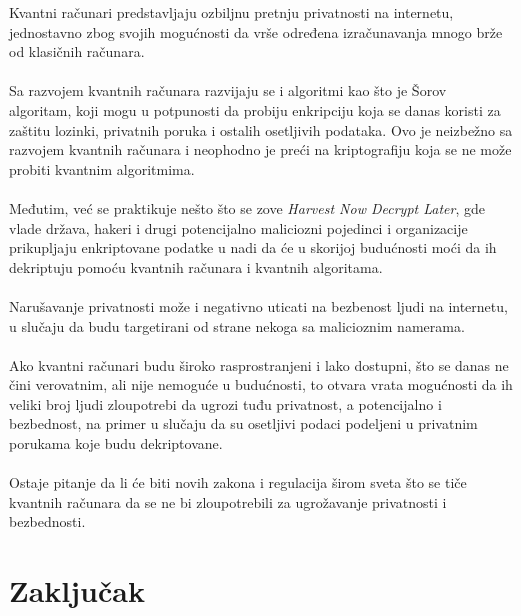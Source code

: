 \documentclass[fleqn, 12pt]{article}
\begin{document}
\begin{text}
Kvantni računari predstavljaju ozbiljnu pretnju privatnosti na internetu, jednostavno zbog svojih mogućnosti da vrše određena izračunavanja mnogo brže od klasičnih računara.
\\\\

Sa razvojem kvantnih računara razvijaju se i algoritmi kao što je Šorov algoritam, koji mogu u potpunosti da probiju enkripciju koja se danas koristi za zaštitu lozinki, privatnih poruka i ostalih osetljivih podataka. Ovo je neizbežno sa razvojem kvantnih računara i neophodno je preći na kriptografiju koja se ne može probiti kvantnim algoritmima.
\\\\

Međutim, već se praktikuje nešto što se zove \textit{Harvest Now Decrypt Later}, gde vlade država, hakeri i drugi potencijalno maliciozni pojedinci i organizacije prikupljaju enkriptovane podatke u nadi da će u skorijoj budućnosti moći da ih dekriptuju pomoću kvantnih računara i kvantnih algoritama.
\\\\

Narušavanje privatnosti može i negativno uticati na bezbenost ljudi na internetu, u slučaju da budu targetirani od strane nekoga sa malicioznim namerama.
\\\\

Ako kvantni računari budu široko rasprostranjeni i lako dostupni, što se danas ne čini verovatnim, ali nije nemoguće u budućnosti, to otvara vrata mogućnosti da ih veliki broj ljudi zloupotrebi da ugrozi tuđu privatnost, a potencijalno i bezbednost, na primer u slučaju da su osetljivi podaci podeljeni u privatnim porukama koje budu dekriptovane.
\\\\

Ostaje pitanje da li će biti novih zakona i regulacija širom sveta što se tiče kvantnih računara da se ne bi zloupotrebili za ugrožavanje privatnosti i bezbednosti.
\end{text}

\newpage

\section{Zaključak}
\end{document}
